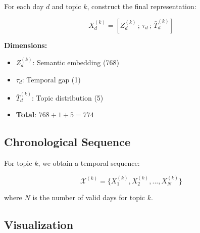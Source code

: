 \documentclass[12pt]{article}
\begin{document}
For each day $d$ and topic $k$, construct the final representation:

\begin{equation}
X_d^{(k)} = [Z_d^{(k)} \,;\, \tau_d \,;\, \bar{T}_d^{(k)}]
\end{equation}

\textbf{Dimensions:}
\begin{itemize}
    \item $Z_d^{(k)}$: Semantic embedding (768)
    \item $\tau_d$: Temporal gap (1)
    \item $\bar{T}_d^{(k)}$: Topic distribution (5)
    \item \textbf{Total}: $768 + 1 + 5 = 774$
\end{itemize}

\subsection{Chronological Sequence}

For topic $k$, we obtain a temporal sequence:

\begin{equation}
\mathcal{X}^{(k)} = \{X_1^{(k)}, X_2^{(k)}, ..., X_N^{(k)}\}
\end{equation}

where $N$ is the number of valid days for topic $k$.

\subsection{Visualization}
\end{document}
